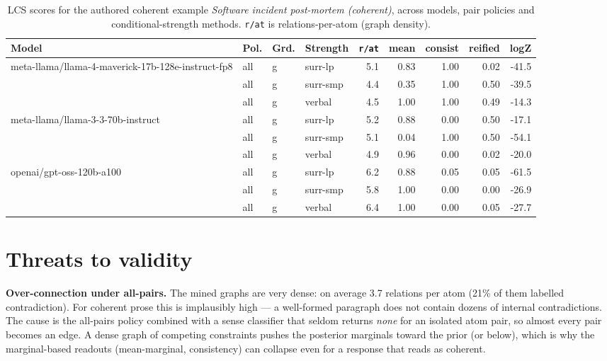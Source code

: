 \documentclass[11pt]{article}
\begin{document}
\begin{table}[htbp]
\centering
\footnotesize
\setlength{\tabcolsep}{4pt}
\caption{LCS scores for the authored coherent example \emph{Software incident post-mortem (coherent)}, across models, pair policies and conditional-strength methods. \texttt{r/at} is relations-per-atom (graph density).}
\label{tab:coherent}
\begin{tabular}{llllrrrrr}
\toprule
\textbf{Model} & \textbf{Pol.} & \textbf{Grd.} & \textbf{Strength} & \texttt{r/at} & mean & consist & reified & logZ \\
\midrule
meta-llama/llama-4-maverick-17b-128e-instruct-fp8 & all & g & surr-lp & 5.1 & 0.83 & 1.00 & 0.02 & -41.5 \\
 & all & g & surr-smp & 4.4 & 0.35 & 1.00 & 0.50 & -39.5 \\
 & all & g & verbal & 4.5 & 1.00 & 1.00 & 0.49 & -14.3 \\
\midrule
meta-llama/llama-3-3-70b-instruct & all & g & surr-lp & 5.2 & 0.88 & 0.00 & 0.50 & -17.1 \\
 & all & g & surr-smp & 5.1 & 0.04 & 1.00 & 0.50 & -54.1 \\
 & all & g & verbal & 4.9 & 0.96 & 0.00 & 0.02 & -20.0 \\
\midrule
openai/gpt-oss-120b-a100 & all & g & surr-lp & 6.2 & 0.88 & 0.05 & 0.05 & -61.5 \\
 & all & g & surr-smp & 5.8 & 1.00 & 0.00 & 0.00 & -26.9 \\
 & all & g & verbal & 6.4 & 1.00 & 0.00 & 0.05 & -27.7 \\
\bottomrule
\end{tabular}
\end{table}


\section{Threats to validity}

\textbf{Over-connection under all-pairs.} The mined graphs are very dense: on average 3.7 relations per atom (21\% of them labelled contradiction). For coherent prose this is implausibly high --- a well-formed paragraph does not contain dozens of internal contradictions. The cause is the all-pairs policy combined with a sense classifier that seldom returns \emph{none} for an isolated atom pair, so almost every pair becomes an edge. A dense graph of competing constraints pushes the posterior marginals toward the prior (or below), which is why the marginal-based readouts (mean-marginal, consistency) can collapse even for a response that reads as coherent.
\end{document}
